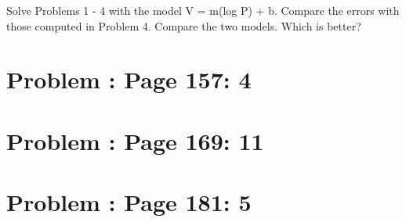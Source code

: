 \documentclass[]{article}
\begin{document}
Solve Problems 1 - 4 with the model V = m(log P) + b. Compare the errors
with those computed in Problem 4. Compare the two models. Which is
better?

\section{Problem : Page 157: 4}\label{problem-page-157-4}

\section{Problem : Page 169: 11}\label{problem-page-169-11}

\section{Problem : Page 181: 5}\label{problem-page-181-5}
\end{document}
